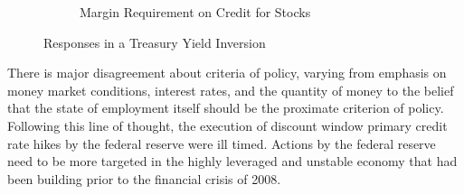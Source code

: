 \begin{figure}[H]
\begin{subfigure}{.5\textwidth}
  \caption{Margin Requirement on Credit for Stocks}
  \label{fig:stocks}
\end{subfigure}
\caption{Responses in a Treasury Yield Inversion}
\label{fig:NEW2}
\end{figure}

There is major disagreement about criteria of policy, varying from emphasis on money market conditions, interest rates, and the quantity of money to the belief that the state of employment itself should be the proximate criterion of policy.\cite{Friedman} Following this line of thought, the execution of discount window primary credit rate hikes by the federal reserve were ill timed.  Actions by the federal reserve need to be more targeted in the highly leveraged and unstable economy that had been building prior to the financial crisis of 2008.

